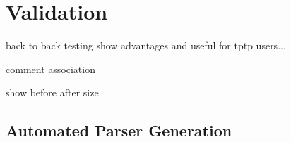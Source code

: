 
\chapter{Validation}\label{sec:Validation}
back to back testing
show advantages and useful for tptp users...

comment association

show before after size
\section{Automated Parser Generation}\label{sec:ValidationAutomatedParserGeneration}
